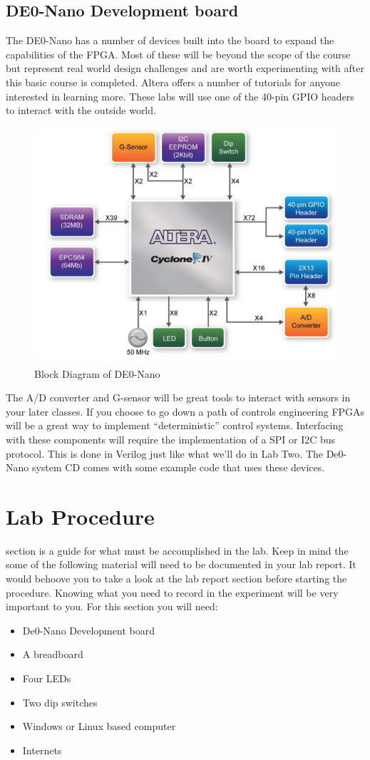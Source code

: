     \subsection{DE0-Nano Development board}
      The DE0-Nano has a number of devices built into the board to expand the capabilities of the FPGA. Most of these will be beyond the scope of the course but represent real world design challenges and are worth experimenting with after this basic course is completed. Altera offers a number of tutorials for anyone interested in learning more. These labs will use one of the 40-pin GPIO headers to interact with the outside world. 
      \begin{figure}[htpb]
        \includegraphics[width=.48\textwidth]{Images/DEONanoBlockDiagram.png}
        \caption{Block Diagram of DE0-Nano \cite{DE0Manual}}
      \end{figure}
      The A/D converter and G-sensor will be great tools to interact with sensors in your later classes. If you choose to go down a path of controls engineering FPGAs will be a great way to implement ``deterministic'' control systems. Interfacing with these components will require the implementation of a SPI or I2C bus protocol. This is done in Verilog just like what we'll do in Lab Two. The De0-Nano system CD comes with some example code that uses these devices. 

  \section{Lab Procedure}
     section is a guide for what must be accomplished in the lab. Keep in mind the some of the following material will need to be documented in your lab report. It would behoove you to take a look at the lab report section before starting the procedure. Knowing what you need to record in the experiment will be very important to you. For this section you will need:
    \begin{itemize}
      \item De0-Nano Development board
      \item A breadboard
      \item Four LEDs
      \item Two dip switches
      \item Windows or Linux based computer
      \item Internets
    \end{itemize}

